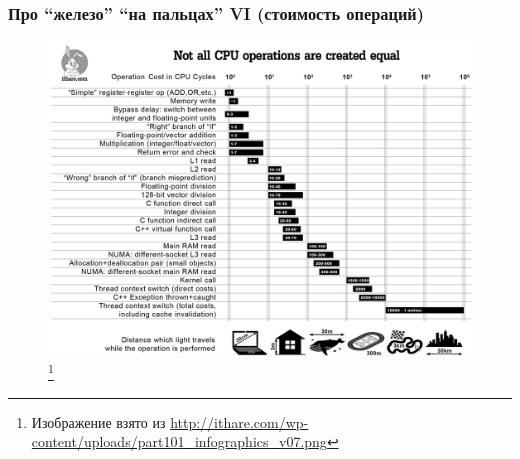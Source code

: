 \documentclass{beamer}
\begin{document}
\begin{frame}
\frametitle{Про ``железо'' ``на пальцах'' VI (стоимость операций)}

\begin{figure}[htb]
\includegraphics[width=\textwidth,height=0.750\textheight,keepaspectratio]{times.png} 
\footnote{\tiny{Изображение взято из \url{http://ithare.com/wp-content/uploads/part101_infographics_v07.png}}}
\end{figure}    
  
\end{frame}
\end{document}
